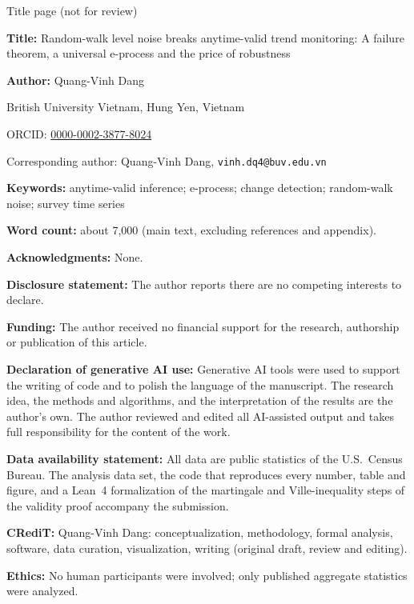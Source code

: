 \documentclass[11pt]{article}
\begin{document}
\noindent Title page (not for review)\bigskip

\noindent\textbf{Title:} Random-walk level noise breaks anytime-valid trend monitoring: A failure theorem, a universal e-process and the price of robustness

\medskip\noindent\textbf{Author:} Quang-Vinh Dang

\noindent British University Vietnam, Hung Yen, Vietnam

\noindent ORCID: \href{https://orcid.org/0000-0002-3877-8024}{0000-0002-3877-8024}

\noindent Corresponding author: Quang-Vinh Dang, \texttt{vinh.dq4@buv.edu.vn}

\medskip\noindent\textbf{Keywords:} anytime-valid inference; e-process; change detection; random-walk noise; survey time series

\medskip\noindent\textbf{Word count:} about 7,000 (main text, excluding references and appendix).

\medskip\noindent\textbf{Acknowledgments:} None.

\medskip\noindent\textbf{Disclosure statement:} The author reports there are no competing interests to declare.

\medskip\noindent\textbf{Funding:} The author received no financial support for the research, authorship or publication of this article.

\medskip\noindent\textbf{Declaration of generative AI use:} Generative AI tools were used to support the writing of code and to polish the language of the manuscript. The research idea, the methods and algorithms, and the interpretation of the results are the author's own. The author reviewed and edited all AI-assisted output and takes full responsibility for the content of the work.

\medskip\noindent\textbf{Data availability statement:} All data are public statistics of the U.S.\ Census Bureau. The analysis data set, the code that reproduces every number, table and figure, and a Lean~4 formalization of the martingale and Ville-inequality steps of the validity proof accompany the submission.

\medskip\noindent\textbf{CRediT:} Quang-Vinh Dang: conceptualization, methodology, formal analysis, software, data curation, visualization, writing (original draft, review and editing).

\medskip\noindent\textbf{Ethics:} No human participants were involved; only published aggregate statistics were analyzed.
\end{document}
